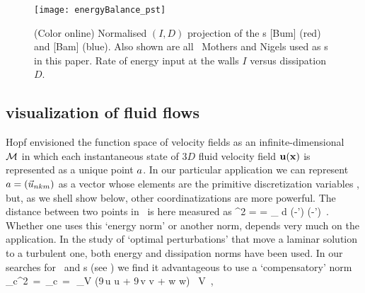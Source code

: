 \begin{figure}
\texttt{[image: energyBalance\_pst]}
\caption{
    (Color online) Normalised $(I,D)$ projection 
of the \rpo s  [Bum]
    (red) and [Bam]  (blue). Also shown are all \reqv\ Mothers and Nigels
    used as \template s in this paper.
    Rate of energy input at the walls $I$ versus dissipation $D$.
    }
\label{f:energyBalance}
\end{figure}


\subsection{{\StateDsp} visualization of fluid flows}
\label{s:visualStatSp}

Hopf envisioned the function space of {\NS} velocity fields as
an infinite-dimensional \statesp\ ${\cal M}$ in which each instantaneous state
of $3D$ fluid velocity field ${\bf u}({\bf x})$ is represented as a unique point
$a$. In our particular application we can represent $a =
(\vec{u}_{nkm})$ as a vector whose elements are the primitive
discretization variables , but, as we shell show below,
other coordinatizations are more powerful. The distance between two
points in \statesp\ is here measured as
\beq
  ^2  =  =
\int_\bCell \! d \bx \;
(-') \cdot (-')
\,.
Whether one uses this {`energy norm'} or another norm, depends very much
on the application. In the study of `optimal perturbations' that move a
laminar solution to a turbulent one, both energy and
dissipation norms have been used.  In our searches
for \reqva\ and \rpo s (see ) we find it advantageous to
use a `compensatory' norm %
\beq
   _c^2 \,=\, _c
   \,=\, \,\int_V (9\,u \cdot u + 9\,v \cdot v + w \cdot w)
        \, V
\,,

